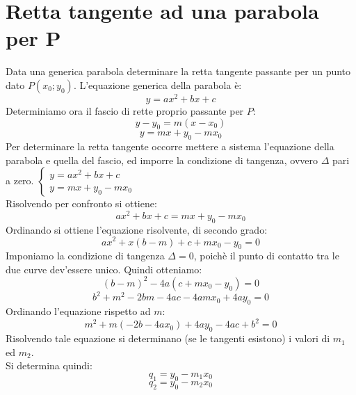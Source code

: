 \documentclass[12pt]{book}
\begin{document}
			\section{Retta tangente ad una parabola per P}
			Data una generica parabola determinare la retta tangente passante per un punto dato $P(x_0;y_0)$.
			L'equazione generica della parabola è:
			\[y=ax^2+bx+c\]
			Determiniamo ora il fascio di rette proprio passante per $P$:
			\[y-y_0=m(x-x_0)\]
			\[y=mx+y_0-mx_0\]
			Per determinare la retta tangente occorre mettere a sistema l'equazione della parabola e quella del fascio, ed imporre la condizione di tangenza, ovvero $\Delta$ pari a zero.
			$\begin{cases}
				y=ax^2+bx+c\\
				y=mx+y_0-mx_0
			\end{cases}$
			\\Risolvendo per confronto si ottiene:
			\[ax^2+bx+c=mx+y_0-mx_0\]
			Ordinando si ottiene l'equazione risolvente, di secondo grado:
			\[ax^2+x(b-m)+c+mx_0-y_0=0\]
			Imponiamo la condizione di tangenza $\Delta=0$, poichè il punto di contatto tra le due curve dev'essere unico.
			Quindi otteniamo:
			\[(b-m)^2-4a(c+mx_0-y_0)=0\]
			\[b^2+m^2-2bm-4ac-4amx_0+4ay_0=0\]
			Ordinando l'equazione rispetto ad $m$:
			\[m^2+m(-2b-4ax_0)+4ay_0-4ac+b^2=0\]
			Risolvendo tale equazione si determinano (se le tangenti esistono) i valori di $m_1$ ed $m_2$.
			\\Si determina quindi:
			\[q_1=y_0-m_1x_0\]
			\[q_2=y_0-m_2x_0\]
			
\end{document}
